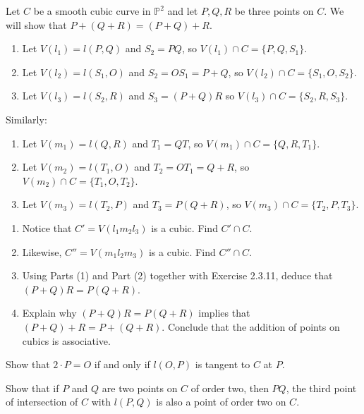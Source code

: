 \begin{tcolorbox}[title=Problem 13, breakable]
    Let $C$ be a smooth cubic curve in $\mathbb{P}^2$ and let $P, Q, R$
    be three points on $C$. We will show that $P + (Q + R) = (P + Q) + R$.
    \begin{enumerate}
        \item Let $V(l_1) = l(P, Q)$ and $S_2 = PQ$, so $V(l_1) \cap C = \{P, Q, S_1\}$.
        \item Let $V(l_2) = l(S_1, O)$ and $S_2 = O S_1 = P + Q$, so $V(l_2) \cap C = \{S_1, O, S_2\}$.
        \item Let $V(l_3) = l(S_2, R)$ and $S_3 = (P + Q) R$ so $V(l_3) \cap C = \{S_2, R, S_3\}$.
    \end{enumerate}
    Similarly:
    \begin{enumerate}
        \item Let $V(m_1) = l(Q, R)$ and $T_1 = QT$, so $V(m_1) \cap C = \{Q, R, T_1\}$.
        \item Let $V(m_2) = l(T_1, O)$ and $T_2 = O T_1 = Q + R$, so $V(m_2) \cap C = \{T_1, O, T_2\}$.
        \item Let $V(m_3) = l(T_2, P)$ and $T_3 = P(Q + R)$, so $V(m_3) \cap C = \{T_2, P, T_3\}$.
    \end{enumerate}
    \begin{enumerate}
        \item Notice that $C' = V(l_1 m_2 l_3)$ is a cubic. Find $C' \cap C$.
        \item Likewise, $C'' = V(m_1 l_2 m_3)$ is a cubic. Find $C'' \cap C$.
        \item Using Parts (1) and Part (2) together with Exercise 2.3.11, deduce that 
        $(P + Q)R = P(Q + R)$.
        \item Explain why $(P + Q)R = P(Q + R)$ implies that $(P + Q) + R = P + (Q + R)$.
        Conclude that the addition of points on cubics is associative.
    \end{enumerate}
\end{tcolorbox}

\begin{tcolorbox}[title=Problem 14, breakable]
    Show that $2 \cdot P = O$ if and only if $l(O, P)$ is tangent to $C$ at $P$.
\end{tcolorbox}

\begin{tcolorbox}[title=Problem 15, breakable]
    Show that if $P$ and $Q$ are two points on $C$ of order two, then $PQ$,
    the third point of intersection of $C$ with $l(P, Q)$ is also a point of order two on $C$.
\end{tcolorbox}

